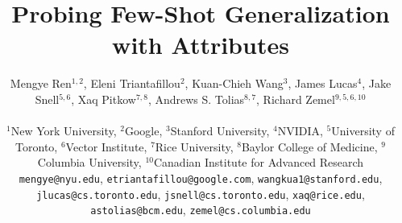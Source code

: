 \documentclass{article} %
\title{Probing Few-Shot Generalization with Attributes}
\author{
  Mengye Ren${}^{1,2}$, Eleni Triantafillou${}^{2}$, Kuan-Chieh Wang${}^{3}$,
  James Lucas${}^{4}$, Jake Snell${}^{5,6}$, Xaq Pitkow${}^{7,8}$, Andrews S.
  Tolias${}^{8,7}$, Richard Zemel${}^{9,5,6,10}$\\\\
  ${}^1$New York University, 
  ${}^2$Google,
  ${}^3$Stanford University,
  ${}^4$NVIDIA,
  ${}^5$University of Toronto,
  ${}^6$Vector Institute,
  ${}^7$Rice University,
  ${}^8$Baylor College of Medicine,
  ${}^9$Columbia University,
  ${}^{10}$Canadian Institute for Advanced Research\\
  \texttt{mengye@nyu.edu}, \texttt{etriantafillou@google.com},
  \texttt{wangkua1@stanford.edu}, \texttt{jlucas@cs.toronto.edu},
  \texttt{jsnell@cs.toronto.edu}, \texttt{xaq@rice.edu},
  \texttt{astolias@bcm.edu}, \texttt{zemel@cs.columbia.edu}
}
\begin{document}
\maketitle

\begin{abstract}
    
\end{abstract}










\appendix
\clearpage

\end{document}
